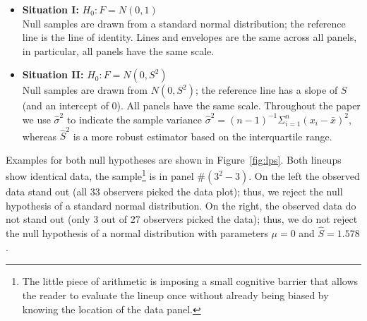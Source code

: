 \documentclass[12pt]{article}\usepackage[]{graphicx}\usepackage[]{color}
\newcommand{\alnote}[1]{\todo[inline,color=green!40]{#1}}
\newcommand{\hhnote}[1]{\todo[inline,color=magenta!40]{#1}}
\begin{document}
\begin{itemize}
\item{\bf Situation I:}
$H_0: F = N(0,1)$  \\
Null samples are drawn from a standard normal distribution; the reference line is the line of identity. Lines and envelopes are the same across all panels, in particular, all panels have the same scale. 
\item{\bf Situation II:} $H_0: F = N(0,S^2)$ \\
Null samples are drawn from $N(0, S^2)$; the reference line has a slope of $S$ (and an intercept of 0).  All panels have the same scale. Throughout the paper we use $\hat{\sigma}^2$ to indicate the sample variance $\hat{\sigma}^2 = (n-1)^{-1} \Sigma_{i=1}^n (x_i - \bar{x})^2$, whereas $\hat{S}^2$ is a more robust estimator based on the interquartile range.
\end{itemize}


Examples for both null hypotheses are shown in Figure~\ref{fig:lps}. Both lineups show identical data, the sample\footnote{The little piece of arithmetic is imposing a small cognitive barrier that allows the reader to evaluate the lineup once without already being biased by knowing the location of the data panel.} is in panel \#$(3^2-3)$. On the left the observed data stand out (all 33 observers picked the data plot); thus, we reject the null hypothesis of a standard normal distribution. On the right, the observed data do not stand out (only 3 out of 27 observers picked the data); thus, we do not reject the null hypothesis of a normal distribution with parameters $\mu=0$ and $\widehat{S}=1.578$. %
\end{document}
